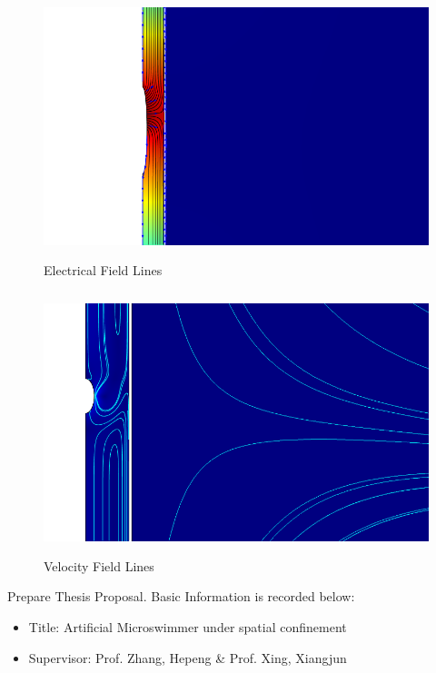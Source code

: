 \documentclass[fontsize=11pt, %
                             paper=a4, %
                             twoside, %
                             captions=tableheading,
                             index=totoc,
                             hyperref]{labbook}
\begin{document}
\begin{addmargin}[4cm]{0cm}
\begin{enumerate}
\begin{figure}
\centering
\includegraphics[width=\linewidth, height=3in]{2016-10-31-electrical-field.png}
\caption{Electrical Field Lines}\label{2016-10-31-EFL}
\end{figure}
\begin{figure}
\centering
\includegraphics[width=\linewidth, height=3in]{2016-10-31-velocity-field.png}
\caption{Velocity Field Lines}\label{2016-10-31-VFL}
\end{figure}
\end{enumerate}

Prepare Thesis Proposal. Basic Information is recorded below:
\begin{itemize}
\item Title: Artificial Microswimmer under spatial confinement
\item Supervisor: Prof. Zhang, Hepeng \& Prof. Xing, Xiangjun
\end{itemize}


\end{addmargin}
\end{document}
